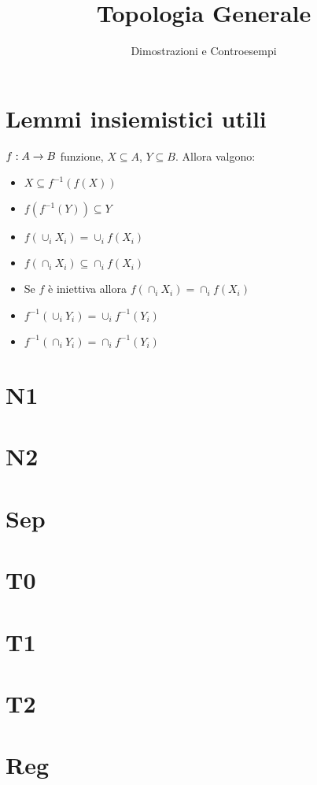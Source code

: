 \documentclass[a4paper,11pt,NoNotes,GeneralMath]{stdmdoc}
\begin{document}
	\title{Topologia Generale}
	\author{Dimostrazioni e Controesempi}
	

	
	\section*{Lemmi insiemistici utili}
	$f: A \rightarrow B$ funzione, $X \subseteq A$, $Y \subseteq B$. Allora valgono:
	\begin{itemize}
		\item $X \subseteq f^{-1}(f(X))$
		\item $f(f^{-1}(Y)) \subseteq Y$
		\item $f(\cup_i X_i) = \cup_i f(X_i)$
		\item $f(\cap_i X_i) \subseteq \cap_i f(X_i)$
		\item Se $f$ è iniettiva allora $f(\cap_i X_i) = \cap_i f(X_i)$
		\item $f^{-1}(\cup_i Y_i) = \cup_i f^{-1}(Y_i)$
		\item $f^{-1}(\cap_i Y_i) = \cap_i f^{-1}(Y_i)$
	\end{itemize}

	\section*{N1}
	\section*{N2}
	\section*{Sep}
	\section*{T0}
	\section*{T1}
	\section*{T2}
	\section*{Reg}
\end{document}
